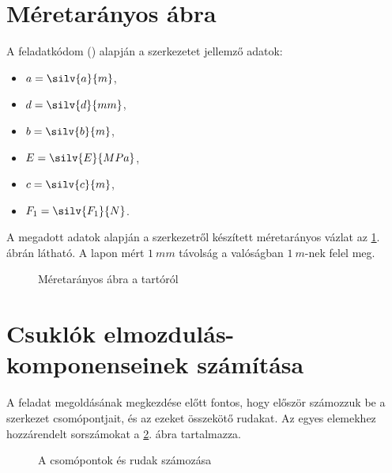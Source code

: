 \documentclass[a4paper, 12pt]{scrartcl}
\begin{document}


\section{Méretarányos ábra} %
\label{sec:Méretarányos ábra}

A feladatkódom (\texttt{})
alapján a szerkezetet jellemző adatok:
\begin{multicols}{3}
  \begin{itemize}
    \item $a = \silv{a}{m}$,
    \item $d = \silv{d}{mm}$,

    \item $b = \silv{b}{m}$,
    \item $E = \silv{E}{MPa}$,

    \item $c = \silv{c}{m}$,
    \item $F_1 = \silv{F_1}{N}$.
  \end{itemize}
\end{multicols}

A megadott adatok alapján a szerkezetről készített méretarányos vázlat az
\ref{fig:construction}. ábrán látható. A lapon mért $\SI{1}{mm}$ távolság
a valóságban $\SI{1}{m}$-nek felel meg.

\begin{figure}[H]
  \centering
  
  \caption{Méretarányos ábra a tartóról}
  \label{fig:construction}
\end{figure}


\section{Csuklók elmozdulás-komponenseinek számítása} %
\label{sec:Csuklók elmozdulás-komponenseinek számítása}

A feladat megoldásának megkezdése előtt fontos, hogy először számozzuk be
a szerkezet csomópontjait, és az ezeket összekötő rudakat. Az egyes elemekhez
hozzárendelt sorszámokat a \ref{fig:numbering}. ábra tartalmazza.

\begin{figure}[H]
  \centering
  
  \caption{A csomópontok és rudak számozása}
  \label{fig:numbering}
\end{figure}
\end{document}
